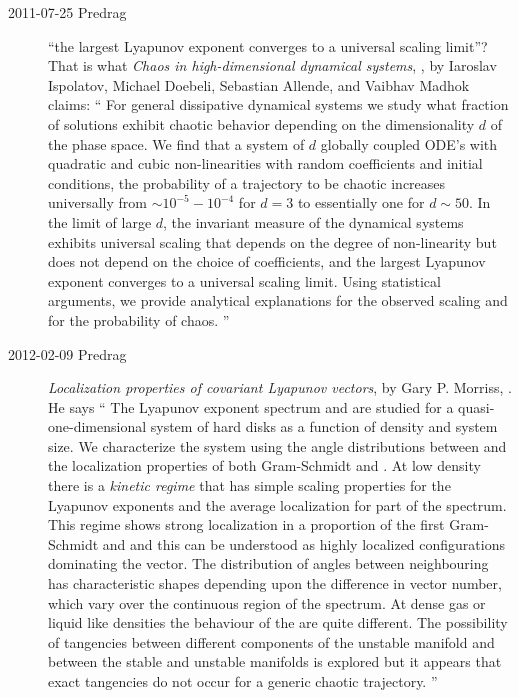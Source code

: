 \begin{description}
\item[2011-07-25 Predrag]
``the largest Lyapunov exponent converges to a
universal scaling limit''? That is what
{\em Chaos in high-dimensional dynamical systems},
, by
Iaroslav Ispolatov, Michael Doebeli, Sebastian Allende, and Vaibhav
  Madhok claims: ``
  For general dissipative dynamical systems we study what fraction of solutions
exhibit chaotic behavior depending on the dimensionality $d$ of the phase
space. We find that a system of $d$ globally coupled ODE's with quadratic and
cubic non-linearities with random coefficients and initial conditions, the
probability of a trajectory to be chaotic increases universally from $\sim
10^{-5} - 10^{-4}$ for $d=3$ to essentially one for $d\sim 50$. In the limit of
large $d$, the invariant measure of the dynamical systems exhibits universal
scaling that depends on the degree of non-linearity but does not depend on the
choice of coefficients, and the largest Lyapunov exponent converges to a
universal scaling limit. Using statistical arguments, we provide analytical
explanations for the observed scaling and for the probability of chaos.
''


\item[2012-02-09 Predrag] {\em Localization properties of covariant
    {Lyapunov} vectors}, by Gary P. Morriss, . He says
    `` The Lyapunov exponent spectrum and {\cLvs} are studied for a
    quasi-one-dimensional system of hard disks as a function of density
    and system size. We characterize the system using the angle
    distributions between {\cLvs} and the localization properties of
    both Gram-Schmidt and {\cLvs}. At low density there is a {\it
    kinetic regime} that has simple scaling properties for the Lyapunov
    exponents and the average localization for part of the spectrum.
    This regime shows strong localization in a proportion of the first
    Gram-Schmidt and {\cLvs} and this can be understood as highly
    localized configurations dominating the vector. The distribution of
    angles between neighbouring {\cLvs} has characteristic shapes
    depending upon the difference in vector number, which vary over the
    continuous region of the spectrum. At dense gas or liquid like
    densities the behaviour of the {\cLvs} are quite different. The
    possibility of tangencies between different components of the
    unstable manifold and between the stable and unstable manifolds is
    explored but it appears that exact tangencies do not occur for a
    generic chaotic trajectory. ''


\end{description}
